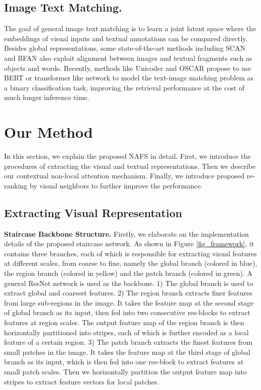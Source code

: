\documentclass[final]{cvpr}
\begin{document}
\subsection{Image Text Matching.}
The goal of general image text matching is to learn a joint latent space where the embeddings of visual inputs and textual annotations can be compared directly. 
Besides global representations, some state-of-the-art methods including  SCAN \cite{lee2018stacked} and BFAN \cite{liu2019focus} also exploit alignment between images and textual fragments such as objects and words. Recently, methods like Unicoder and OSCAR \cite{li2020unicoder,li2020oscar} propose to use BERT \cite{devlin2018bert} or transformer \cite{vaswani2017attention} like network to model the text-image matching problem as a binary classification task, improving the retrieval performance at the cost of much longer inference time. 

\section{Our Method} 
In this section, we explain the proposed NAFS in detail. First, we introduce the procedures of extracting the visual and textual representations. Then we describe our contextual non-local attention mechanism. Finally, we introduce proposed re-ranking by visual neighbors to further improve the performance.
\subsection{Extracting Visual Representation}
\textbf{Staircase Backbone Structure.} Firstly, we elaborate on the implementation details of the proposed staircase network. As shown in Figure \ref{fig_framework}, 
it contains three branches, each of which is responsible for extracting visual features at different scales, from coarse to fine, namely the global branch (colored in blue), the region branch (colored in yellow) and the patch branch (colored in green). A general ResNet \cite{he2016deep} network is used as the backbone. 
1) The global branch is used to extract global and coarsest features. 
2) The region branch extracts finer features from large sub-regions in the image. It takes the feature map at the second stage of global branch as its input, then fed into two consecutive res-blocks to extract features at region scales. The output feature map of the region branch is then horizontally partitioned into  stripes, each of which is further encoded as a local feature of a certain region. 
3) The patch branch extracts the finest features from small patches in the image. It takes the feature map at the third stage of global branch as its input, which is then fed into one res-block to extract features at small patch scales. Then we horizontally partition the output feature map into   stripes to extract  feature vectors for local patches.
\end{document}
